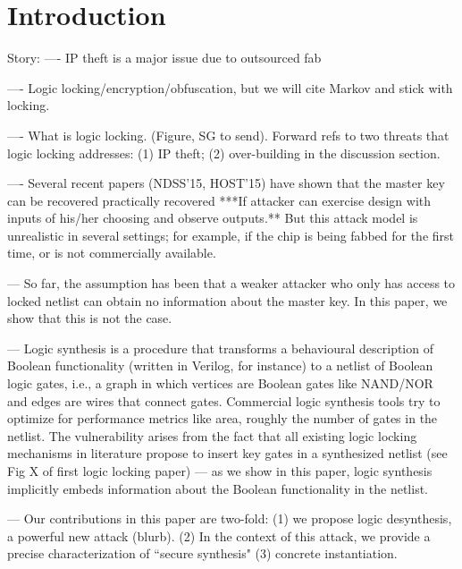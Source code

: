 \section{Introduction}

Story:
 ---- IP theft is a major issue due to outsourced fab
 
 ---- Logic locking/encryption/obfuscation, but we will cite Markov and stick with locking.
 
 ---- What is logic locking. (Figure, SG to send). Forward refs 
 to two threats that logic locking addresses: (1) IP theft; (2) over-building in the discussion section.
 
 ---- Several recent papers (NDSS'15, HOST'15) have shown that the master key can be recovered practically recovered ***If attacker can exercise design with inputs of his/her choosing and observe outputs.** But this attack model is unrealistic in several settings; for example, if the chip is being fabbed for the first time, or is not commercially available. 
 
 --- So far, the assumption has been that a weaker attacker who only has access to locked netlist can obtain no information about the master key. In this paper, we show that this is not the case. 
 
 
--- Logic synthesis is a procedure that transforms a behavioural description of Boolean functionality (written in Verilog, for instance) to a netlist of Boolean logic gates, i.e., a graph in which vertices are Boolean gates like NAND/NOR and edges are wires that connect gates. Commercial logic synthesis tools try to optimize for performance metrics like area, roughly the number of gates in the netlist. The vulnerability arises from the fact that all existing 
logic locking mechanisms in literature propose to insert key gates 
in a synthesized netlist (see Fig X of first logic locking paper) 
--- as we show in this paper, logic synthesis implicitly embeds information about the Boolean functionality in the netlist. 

--- Our contributions in this paper are two-fold: 
(1) we propose logic desynthesis, a 
powerful new attack (blurb). 
(2) In the context of this attack, we provide a 
precise 
characterization of ``secure synthesis" 
(3) concrete instantiation.







 
 
 
 
 
 
